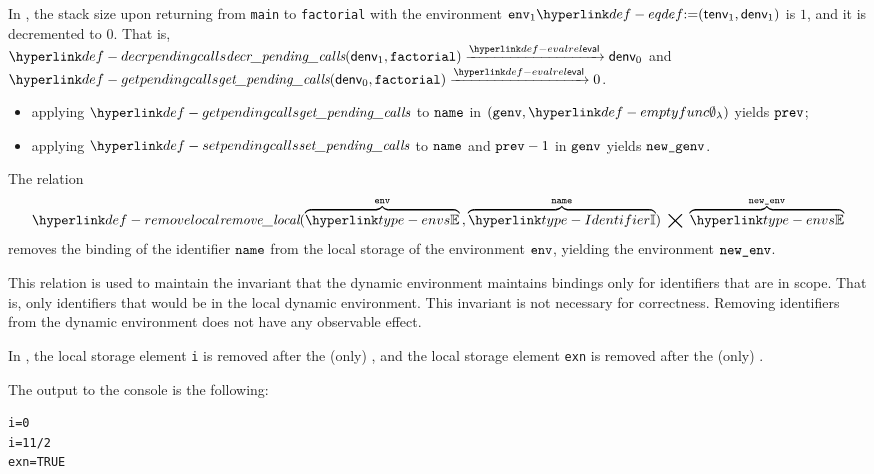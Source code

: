 In , the stack size upon returning from \verb|main| to \verb|factorial|
with the environment $\env_1 \eqdef (\tenv_1, \denv_1)$ is $1$, and it is decremented to $0$.
That is, \\
$\decrpendingcalls(\denv_1, \factorial) \evalarrow \denv_0$
and\\
$\getpendingcalls(\denv_0, \factorial) \evalarrow 0$.

\ProseParagraph
\AllApply
\begin{itemize}
  \item applying $\getpendingcalls$ to $\name$ in $(\genv, \emptyfunc)$ yields $\vprev$;
  \item applying $\setpendingcalls$ to $\name$ and $\vprev - 1$ in $\genv$ yields $\newgenv$.
\end{itemize}

\FormallyParagraph
\begin{mathpar}
\end{mathpar}

\ProseParagraph
The relation
\hypertarget{def-removelocal}{}
\[
  \removelocal(\overname{\envs}{\env} \aslsep \overname{\Identifier}{\name}) \;\aslrel\; \overname{\envs}{\newenv}
\]
removes the binding of the identifier $\name$ from the local storage of the environment $\env$,
yielding the environment $\newenv$.

This relation is used to maintain the invariant that the dynamic environment
maintains bindings only for identifiers that are in scope. That is, only identifiers
that would be in the local dynamic environment.
%
This invariant is not necessary for correctness.
Removing identifiers from the dynamic environment does not have any
observable effect.

In , the local storage element \verb|i| is removed after the (only) \forstatementterm,
and the local storage element \verb|exn| is removed after the (only) \trystatementterm.

The output to the console is the following:
\begin{Verbatim}[fontsize=\footnotesize, frame=single]
i=0
i=11/2
exn=TRUE
\end{Verbatim}

